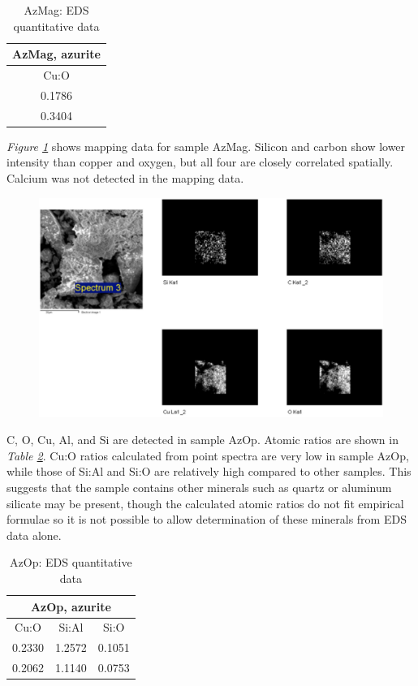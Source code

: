 \begin{table}[H]
\caption{AzMag: EDS quantitative data}
\centering
\label{table:azmag_ratios}
\begin{tabular}{c }
\toprule
AzMag, azurite \\
\midrule
Cu:O \\
\midrule
0.1786 \\
0.3404 \\
\bottomrule
\end{tabular}
\end{table}

\textit{Figure \ref{fig:azmag_map1}} shows mapping data for sample AzMag. Silicon and carbon show lower intensity than copper and oxygen, but all four are closely correlated spatially. Calcium was not detected in the mapping data.

\begin{figure}[H]
\centering
  \includegraphics[width=0.9\linewidth]{AzMag_EDS_map1_260221_imgs}
\label{fig:azmag_map1}
\end{figure}



C, O, Cu, Al, and Si are detected in sample AzOp. Atomic ratios are shown in \textit{Table \ref{table:azop_ratios}}. Cu:O ratios calculated from point spectra are very low in sample AzOp, while those of Si:Al and Si:O are relatively high compared to other samples. This suggests that the sample contains other minerals such as quartz or aluminum silicate may be present, though the calculated atomic ratios do not fit empirical formulae so it is not possible to allow determination of these minerals from EDS data alone.

\begin{table}[H]
\caption{AzOp: EDS quantitative data}
\centering
\label{table:azop_ratios}
\begin{tabular}{c c c}
\toprule
\multicolumn{3}{c}{AzOp, azurite} \\
\midrule
Cu:O & Si:Al & Si:O \\
\midrule
0.2330 & 1.2572 & 0.1051 \\
0.2062 & 1.1140 & 0.0753 \\
\bottomrule
\end{tabular}
\end{table}

